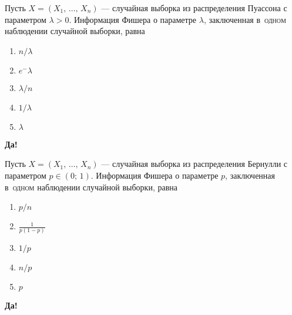 \documentclass[t]{beamer}
\begin{document}
 \begin{frame} \label{21-Yes} 
\begin{block}{21} 

  Пусть $X = (X_1, \, \ldots, \, X_n)$ — случайная выборка из распределения Пуассона с параметром $\lambda > 0$. Информация Фишера о параметре $\lambda$, заключенная в~\textsc{одном} наблюдении случайной выборки, равна


 \end{block} 
\begin{enumerate} 
\item[] \hyperlink{21-No}{\beamergotobutton{}  $n / \lambda$}
\item[] \hyperlink{21-No}{\beamergotobutton{} $e^-\lambda$}
\item[] \hyperlink{21-No}{\beamergotobutton{} $\lambda / n$}
\item[] \hyperlink{21-Yes}{\beamergotobutton{} $1 / \lambda$}
\item[] \hyperlink{21-No}{\beamergotobutton{} $\lambda$}
\end{enumerate} 

 \textbf{Да!} 
 \hyperlink{22}{}\end{frame} 


 \begin{frame} \label{22-Yes} 
\begin{block}{22} 

  Пусть $X = (X_1, \, \ldots, \, X_n)$ — случайная выборка из распределения Бернулли с параметром $p \in (0;\,1)$. Информация Фишера о параметре $p$, заключенная в~\textsc{одном} наблюдении случайной выборки, равна


 \end{block} 
\begin{enumerate} 
\item[] \hyperlink{22-No}{\beamergotobutton{} $p/n$}
\item[] \hyperlink{22-Yes}{\beamergotobutton{} $\frac{1}{p(1-p)}$}
\item[] \hyperlink{22-No}{\beamergotobutton{} $1/p$}
\item[] \hyperlink{22-No}{\beamergotobutton{} $n/p$}
\item[] \hyperlink{22-No}{\beamergotobutton{} $p$}
\end{enumerate} 

 \textbf{Да!} 
 \hyperlink{23}{}\end{frame} 
\end{document}

